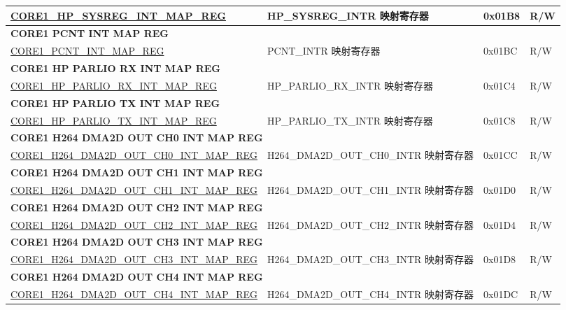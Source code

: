 \begin{longtable}{ | p{7.5cm} | p{7.2cm} | p{1.3cm} | p{1cm} | }
\hyperref[regdesc:CORE1HPSYSREGINTMAPREG]{CORE1\_HP\_SYSREG\_INT\_MAP\_REG} & HP\_SYSREG\_INTR 映射寄存器 & 0x01B8 & R/W \\ \hline
\multicolumn{4}{|l|}{\textbf{CORE1 PCNT INT MAP REG}} \\ \hline
\hyperref[regdesc:CORE1PCNTINTMAPREG]{CORE1\_PCNT\_INT\_MAP\_REG} & PCNT\_INTR 映射寄存器 & 0x01BC & R/W \\ \hline
\multicolumn{4}{|l|}{\textbf{CORE1 HP PARLIO RX INT MAP REG}} \\ \hline
\hyperref[regdesc:CORE1HPPARLIORXINTMAPREG]{CORE1\_HP\_PARLIO\_RX\_INT\_MAP\_REG} & HP\_PARLIO\_RX\_INTR 映射寄存器 & 0x01C4 & R/W \\ \hline
\multicolumn{4}{|l|}{\textbf{CORE1 HP PARLIO TX INT MAP REG}} \\ \hline
\hyperref[regdesc:CORE1HPPARLIOTXINTMAPREG]{CORE1\_HP\_PARLIO\_TX\_INT\_MAP\_REG} & HP\_PARLIO\_TX\_INTR 映射寄存器 & 0x01C8 & R/W \\ \hline
\multicolumn{4}{|l|}{\textbf{CORE1 H264 DMA2D OUT CH0 INT MAP REG}} \\ \hline
\hyperref[regdesc:CORE1H264DMA2DOUTCH0INTMAPREG]{CORE1\_H264\_DMA2D\_OUT\_CH0\_INT\_MAP\_REG} & H264\_DMA2D\_OUT\_CH0\_INTR 映射寄存器 & 0x01CC & R/W \\ \hline
\multicolumn{4}{|l|}{\textbf{CORE1 H264 DMA2D OUT CH1 INT MAP REG}} \\ \hline
\hyperref[regdesc:CORE1H264DMA2DOUTCH1INTMAPREG]{CORE1\_H264\_DMA2D\_OUT\_CH1\_INT\_MAP\_REG} & H264\_DMA2D\_OUT\_CH1\_INTR 映射寄存器 & 0x01D0 & R/W \\ \hline
\multicolumn{4}{|l|}{\textbf{CORE1 H264 DMA2D OUT CH2 INT MAP REG}} \\ \hline
\hyperref[regdesc:CORE1H264DMA2DOUTCH2INTMAPREG]{CORE1\_H264\_DMA2D\_OUT\_CH2\_INT\_MAP\_REG} & H264\_DMA2D\_OUT\_CH2\_INTR 映射寄存器 & 0x01D4 & R/W \\ \hline
\multicolumn{4}{|l|}{\textbf{CORE1 H264 DMA2D OUT CH3 INT MAP REG}} \\ \hline
\hyperref[regdesc:CORE1H264DMA2DOUTCH3INTMAPREG]{CORE1\_H264\_DMA2D\_OUT\_CH3\_INT\_MAP\_REG} & H264\_DMA2D\_OUT\_CH3\_INTR 映射寄存器 & 0x01D8 & R/W \\ \hline
\multicolumn{4}{|l|}{\textbf{CORE1 H264 DMA2D OUT CH4 INT MAP REG}} \\ \hline
\hyperref[regdesc:CORE1H264DMA2DOUTCH4INTMAPREG]{CORE1\_H264\_DMA2D\_OUT\_CH4\_INT\_MAP\_REG} & H264\_DMA2D\_OUT\_CH4\_INTR 映射寄存器 & 0x01DC & R/W \\ \hline

\end{longtable}
